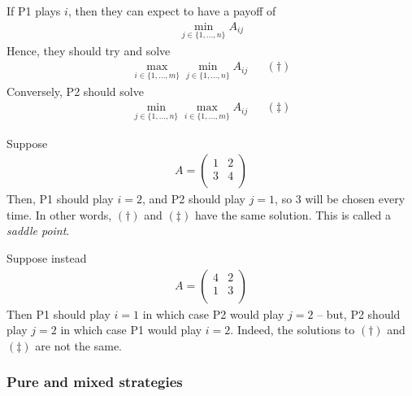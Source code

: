 \documentclass{../../template/note}
\begin{document}
    If P1 plays $i$, then they can expect to have a payoff of
    \begin{align*}
        \min_{j \in \{1, \dots, n\}} A_{ij}
    \end{align*}
    Hence, they should try and solve
    \begin{align*}
        \max_{i \in \{1, \dots, m\}} \min_{j \in \{1, \dots, n\}} A_{ij} && (\dagger)
    \end{align*}
    Conversely, P2 should solve
    \begin{align*}
        \min_{j \in \{1, \dots, n\}} \max_{i \in \{1, \dots, m\}} A_{ij} && (\ddagger)
    \end{align*}
    
    \begin{example*}
        Suppose
        \begin{align*}
            A = \begin{pmatrix}
                1 & 2 \\
                3 & 4 \\
            \end{pmatrix}
        \end{align*}
        Then, P1 should play $i=2$, and P2 should play $j=1$, so 3 will be chosen every time. In other words, $(\dagger)$ and $(\ddagger)$ have the same solution. This is called a \emph{saddle point}.        
    \end{example*}
    
    \begin{example*}
        Suppose instead
        \begin{align*}
            A = \begin{pmatrix}
                4 & 2 \\
                1 & 3 \\
            \end{pmatrix}
        \end{align*}
        Then P1 should play $i=1$ in which case P2 would play $j=2$ -- but, P2 should play $j=2$ in which case P1 would play $i=2$. Indeed, the solutions to $(\dagger)$ and $(\ddagger)$ are not the same.        
    \end{example*}
    
    \subsubsection{Pure and mixed strategies}
\end{document}
